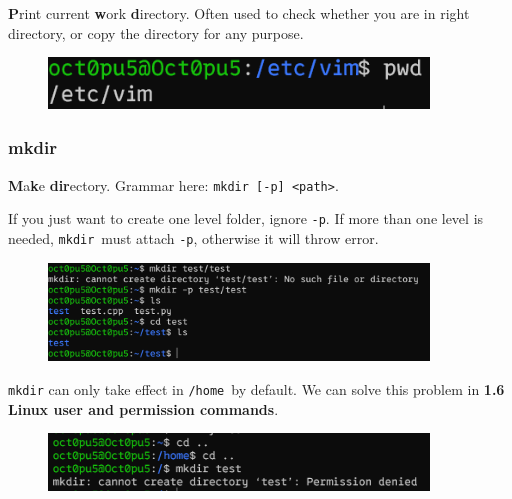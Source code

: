 \documentclass[12pt]{ctexart}
\newenvironment{mdquote}
{%
  \par\noindent
  \begin{list}{}{%
      \setlength{\leftmargin}{1em}%
      \setlength{\rightmargin}{0pt}%
      \setlength{\itemindent}{0pt}%
      \setlength{\listparindent}{\parindent}%
      \setlength{\topsep}{0.5\baselineskip}%
  }
  \item[\textbf{>}\ ]\itshape
}
{\end{list}\par}
\begin{document}
\textbf{P}rint current \textbf{w}ork \textbf{d}irectory. Often used to
check whether you are in right directory, or copy the directory for any
purpose.

\begin{figure}[H]
    \centering
    \includegraphics[width=0.9\textwidth,keepaspectratio]{assets/Linux/1.4 Linux directory structure and command/5.png}
\end{figure}

\subsubsection*{\textbf{mkdir}}

\textbf{M}a\textbf{k}e \textbf{dir}ectory. Grammar here:
\texttt{mkdir\ {[}-p{]}\ \textless{}path\textgreater{}}.

If you just want to create one level folder, ignore \texttt{-p}. If more
than one level is needed, \texttt{mkdir}\ must attach \texttt{-p},
otherwise it will throw error.

\begin{figure}[H]
    \centering
    \includegraphics[width=0.9\textwidth,keepaspectratio]{assets/Linux/1.4 Linux directory structure and command/6.png}
\end{figure}

\begin{mdquote}
\texttt{mkdir} can only take effect in \texttt{/home}\ by default. We can
solve this problem in \textbf{1.6 Linux user and permission commands}.
\end{mdquote}

\begin{figure}[H]
    \centering
    \includegraphics[width=0.9\textwidth,keepaspectratio]{assets/Linux/1.4 Linux directory structure and command/7.png}
\end{figure}
\end{document}
